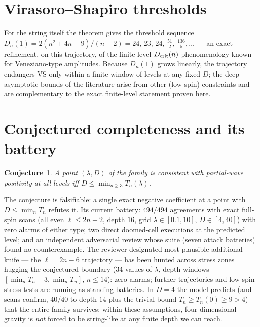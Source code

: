 \documentclass[11pt]{article}
\newtheorem{conjecture}{Conjecture}
\begin{document}
\section{Virasoro--Shapiro thresholds}

For the string itself the theorem gives the threshold sequence
$D_n(1)=2(n^2+4n-9)/(n-2)=24,\,23,\,24,\,\tfrac{51}2,\,\tfrac{136}5,\ldots$
--- an exact refinement, on this trajectory, of the finite-level
$D_{\rm crit}(n)$ phenomenology known for Veneziano-type amplitudes. Because
$D_n(1)$ grows linearly, the trajectory endangers VS only within a finite
window of levels at any fixed $D$; the deep asymptotic bounds of the
literature arise from other (low-spin) constraints and are complementary to
the exact finite-level statement proven here.

\section{Conjectured completeness and its battery}

\begin{conjecture}\label{conj:model}
A point $(\lambda,D)$ of the family is consistent with partial-wave
positivity at all levels iff $D\le\min_{n\ge3}T_n(\lambda)$.
\end{conjecture}

The conjecture is falsifiable: a single exact negative coefficient at a point
with $D\le\min_nT_n$ refutes it. Its current battery: $494/494$ agreements
with exact full-spin scans (all even $\ell\le2n-2$, depth $16$, grid
$\lambda\in[0.1,10]$, $D\in[4,40]$) with zero alarms of either type; two
direct doomed-cell executions at the predicted level; and an independent
adversarial review whose suite (seven attack batteries) found no
counterexample. The reviewer-designated most plausible additional knife --- the
$\ell=2n-6$ trajectory --- has been hunted across stress zones hugging the
conjectured boundary (34 values of $\lambda$, depth windows $[\min_nT_n-3,
\min_nT_n]$, $n\le14$): zero alarms; further trajectories and low-spin
stress tests are running as standing batteries. In $D=4$ the model predicts (and scans confirm,
$40/40$ to depth $14$ plus the trivial bound $T_n\ge T_n(0)\ge9>4$) that the
entire family survives: within these assumptions, four-dimensional gravity is
\emph{not} forced to be string-like at any finite depth we can reach.
\end{document}
